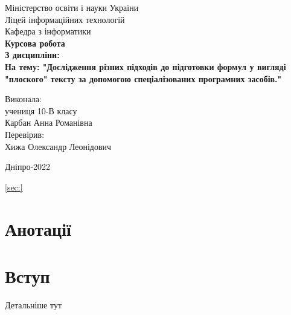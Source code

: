\documentclass[a4paper]{article}
\begin{document}
\thispagestyle{empty}
\begin{center}
\hfill \break
\normalsize{Міністерство освіти і науки України}\\
\normalsize{Ліцей інформаційних технологій}\\
\normalsize{Кафедра з інформатики}\\
\hfill\break
\hfill \break
\hfill \break
\hfill \break
\large{\textbf{Курсова робота}}\\
\normalsize{\textbf{З дисципліни:}}\\
\textbf{На тему: "Дослідження різних підходів до підготовки формул у вигляді "плоского" тексту за допомогою спеціалізованих програмних засобів."}\\
\end{center}


\begin{flushright}
\normalsize{Виконала:}\\
\normalsize{учениця 10-В класу}\\
\normalsize{Карбан Анна Романівна}\\
\normalsize{Перевірив:}\\
\normalsize{Хижа Олександр Леонідович}\\
\end{flushright}


\begin{center}
  Дніпро-2022 \pagebreak
\end{center}

\newpage
\begin{center}
   \tableofcontents %
   \label{sec:}
   \ref{sec:}
\end{center}

\newpage
\section{Анотації}
\newpage
\section{Вступ}
Детальніше тут\cite{LateX_Baldin}
\newpage
\end{document}
